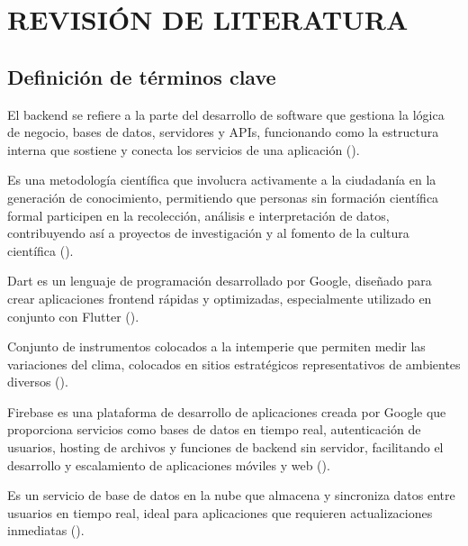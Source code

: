 \chapter{REVISIÓN DE LITERATURA}
\label{cap:3}
\section{Definición de términos clave} 
\begin{definition}[Backend]
El backend se refiere a la parte del desarrollo de software que gestiona la lógica de negocio, bases de datos, servidores y APIs, funcionando como la estructura interna que sostiene y conecta los servicios de una aplicación (\cite{backend}).
\end{definition}

\begin{definition}
Es una metodología científica que involucra activamente a la ciudadanía en la generación de conocimiento, permitiendo que personas sin formación científica formal participen en la recolección, análisis e interpretación de datos, contribuyendo así a proyectos de investigación y al fomento de la cultura científica (\cite{csic_ciencia_ciudadana}).
\end{definition}

\begin{definition}[Dart]
Dart es un lenguaje de programación desarrollado por Google, diseñado para crear aplicaciones frontend rápidas y optimizadas, especialmente utilizado en conjunto con Flutter (\cite{dart}). 
\end{definition}

\begin{definition}
Conjunto de instrumentos colocados a la intemperie que permiten medir las variaciones del clima, colocados en sitios estratégicos representativos de ambientes diversos (\cite{conagua_estaciones_climatologicas_2013}).
\end{definition}

\begin{definition}[Firebase]
Firebase es una plataforma de desarrollo de aplicaciones creada por Google que proporciona servicios como bases de datos en tiempo real, autenticación de usuarios, hosting de archivos y funciones de backend sin servidor, facilitando el desarrollo y escalamiento de aplicaciones móviles y web (\cite{firebase}). 
\end{definition}

\begin{definition}
Es un servicio de base de datos en la nube que almacena y sincroniza datos entre usuarios en tiempo real, ideal para aplicaciones que requieren actualizaciones inmediatas (\cite{firebaserealtime}). 
\end{definition}

